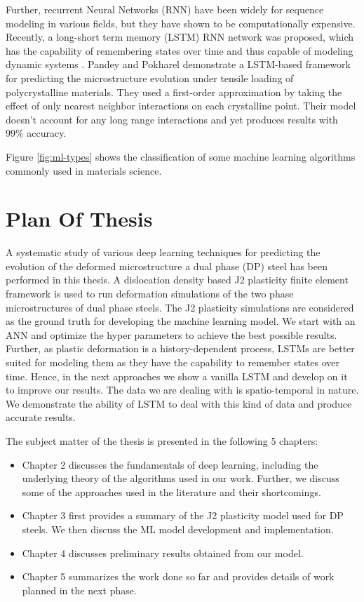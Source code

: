 Further, recurrent Neural Networks (RNN) have been widely for sequence modeling in various fields, but they have shown to be computationally expensive. Recently, a long-short term memory (LSTM) RNN network was proposed, which has the capability of remembering states over time and thus capable of modeling dynamic systems \cite{hochreiter1997long}. Pandey and Pokharel \cite{pandey2020machine} demonstrate a LSTM-based framework for predicting the microstructure evolution under tensile loading of polycrystalline materials. They used a first-order approximation by taking the effect of only nearest neighbor interactions on each crystalline point. Their model doesn't account for any long range interactions and yet produces results with 99\% accuracy. 

Figure \ref{fig:ml-types} shows the classification of some machine learning algorithms commonly used in materials science.

\section{Plan Of Thesis}
A systematic study of various deep learning techniques for predicting the evolution of the deformed microstructure a dual phase (DP) steel has been performed in this thesis. A dislocation density based J2 plasticity finite element framework is used to run deformation simulations of the two phase microstructures of dual phase steels. The J2 plasticity simulations are considered as the ground truth for developing the machine learning model. We start with an ANN and optimize the hyper parameters to achieve the best possible results. Further, as plastic deformation is a history-dependent process, LSTMs are better suited for modeling them as they have the capability to remember states over time. Hence, in the next approaches we show a vanilla LSTM and develop on it to improve our results. The data we are dealing with is spatio-temporal in nature. We demonstrate the ability of LSTM to deal with this kind of data and produce accurate results. 

The subject matter of the thesis is presented in the following 5 chapters:
\begin{itemize}
\item Chapter 2 discusses the fundamentals of deep learning, including the underlying theory of the algorithms used in our work. Further, we discuss some of the approaches used in the literature and their shortcomings.
\item Chapter 3 first provides a summary of the J2 plasticity model used for DP steels. We then discuss the ML model development and implementation.
\item Chapter 4 discusses preliminary results obtained from our model.
\item Chapter 5 summarizes the work done so far and provides details of work planned in the next phase.  
\end{itemize}